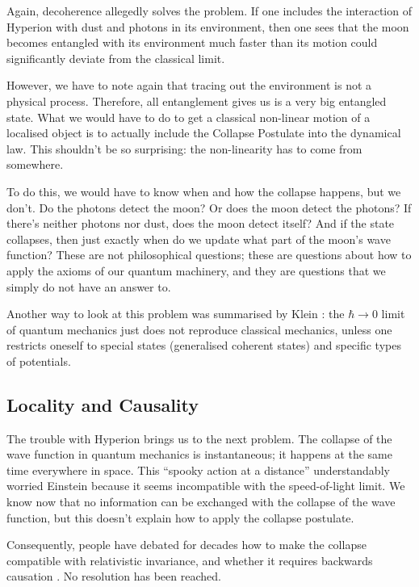 \documentclass[superscriptaddress,floatfix,nofootinbib,12pt]{revtex4-2}
\begin{document}
Again, decoherence allegedly solves the problem. If one includes the interaction of Hyperion with dust and photons in its environment, then one sees that the moon becomes entangled with its environment much faster than its motion could significantly deviate from the classical limit. 

However, we have to note again that tracing out the environment is not a physical process. Therefore, all entanglement gives us is a very big entangled state. What we would have to do to get a classical non-linear motion of a localised object is to actually include the Collapse Postulate into the dynamical law. This shouldn't be so surprising: the non-linearity has to come from somewhere. 

To do this, we would have to know when and how the collapse happens, but we don't. Do the photons detect the moon? Or does the moon detect the photons? If there's neither photons nor dust, does the moon detect itself? And if the state collapses, then just exactly when do we update what part of the moon's wave function? These are not philosophical questions; these are questions about how to apply the axioms of our quantum machinery, and they are questions that we simply do not have an answer to. 

Another way to look at this problem was summarised by Klein \cite{klein2011limit}: the $\hbar \to 0$ limit of quantum mechanics just does not reproduce classical mechanics, unless one restricts oneself to special states (generalised coherent states) and specific types of potentials.  
 
 \subsection{Locality and Causality}
 
The trouble with Hyperion brings us to the next problem. The collapse of the wave function in quantum mechanics is instantaneous; it happens at the same time everywhere in space. This ``spooky action at a distance'' \cite{Einstein1935EPR} understandably worried Einstein because it seems incompatible with the speed-of-light limit. We know now \cite{ghirardi1980general} that no information can be exchanged with the collapse of the wave function, but this doesn't explain how to apply the collapse postulate.

Consequently, people have debated for decades how to make the collapse compatible with relativistic invariance, and whether it requires backwards causation \cite{Percival1998Relativity,marolf2002relativistic,myrvold2002peaceful}. No resolution has been reached. 
\end{document}
